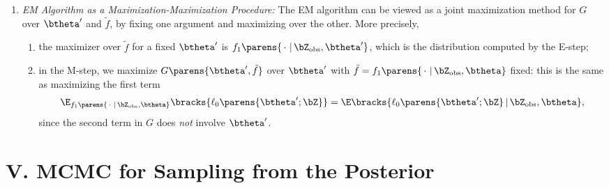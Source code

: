 \documentclass[12pt]{article}
\begin{document}
\begin{enumerate}[label=\textbf{\arabic*.}]
\begin{enumerate}
		\item \textit{EM Algorithm as a Maximization-Maximization Procedure:} The EM algorithm can be viewed as a joint maximization method for $G$ over $\btheta'$ and $\tilde{f}$, by fixing one argument and maximizing over the other. More precisely, 
		\begin{enumerate}
			\item the maximizer over $\tilde{f}$ for a fixed $\btheta'$ is $f_1 \parens{\,\cdot\, \,\vert\, \bZ_{\mathrm{obs}}, \btheta'}$, which is the distribution computed by the E-step; 
			\item in the M-step, we maximize $G \parens{\btheta', \tilde{f}}$ over $\btheta'$ with $\tilde{f} = f_1 \parens{\,\cdot\, \,\vert\, \bZ_{\mathrm{obs}}, \btheta}$ fixed: this is the same as maximizing the first term 
			\begin{align*}
				\E_{f_1 \parens{\,\cdot\, \,\vert\, \bZ_{\mathrm{obs}}, \btheta}} \bracks{ \ell_0 \parens{\btheta'; \bZ} } = \E \bracks{ \ell_0 \parens{\btheta'; \bZ} \,\vert\, \bZ_{\mathrm{obs}}, \btheta}, 
			\end{align*}
			since the second term in $G$ does \emph{not} involve $\btheta'$. 
		\end{enumerate}
	\end{enumerate}
	
\end{enumerate}


\section*{V. MCMC for Sampling from the Posterior}
\end{document}
